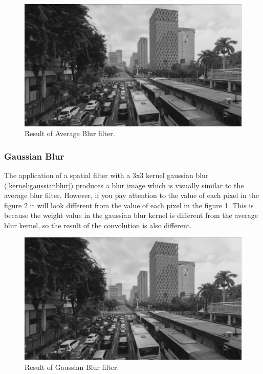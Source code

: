 \begin{figure}
    \includegraphics[width=0.8\linewidth, center]{images/output-image/input1-averageblur.png}
    \caption{Result of Average Blur filter.}
    \label{fig:output-averageblur}
\end{figure}

\subsubsection{Gaussian Blur}

The application of a spatial filter with a 3x3 kernel gaussian blur (\ref{kernel:gaussianblur}) produces a blur image which is visually similar to the average blur filter. However, if you pay attention to the value of each pixel in the figure \ref{fig:output-gaussianblur} it will look different from the value of each pixel in the figure \ref{fig:output-averageblur}. This is because the weight value in the gaussian blur kernel is different from the average blur kernel, so the result of the convolution is also different.

\begin{figure}
    \includegraphics[width=0.8\linewidth, center]{images/output-image/input1-gaussianblur.png}
    \caption{Result of Gaussian Blur filter.}
    \label{fig:output-gaussianblur}
\end{figure}

